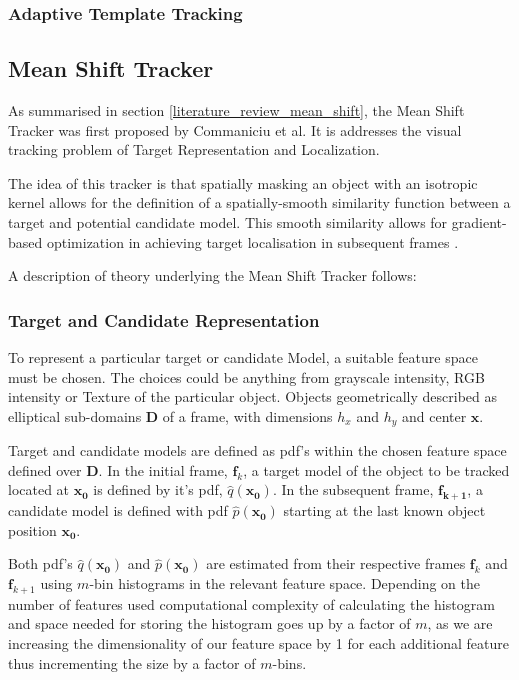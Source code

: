 \subsubsection{Adaptive Template Tracking}


\subsection{Mean Shift Tracker}
As summarised in section \ref{literature_review_mean_shift}, the Mean Shift Tracker was
first proposed by Commaniciu et al. It is addresses the
visual tracking problem of Target Representation and Localization.

The idea of this tracker is that spatially masking an object with an
isotropic kernel allows for the definition of a spatially-smooth similarity
function between a target and potential candidate model. This smooth similarity
allows for gradient-based optimization in achieving target localisation in
subsequent frames \cite{Comaniciu2003}.

A description of theory underlying the Mean Shift Tracker follows:

\subsubsection{Target and Candidate Representation}
To represent a particular target or candidate Model, a suitable feature space
must be chosen. The choices could be anything from grayscale intensity, RGB
intensity or Texture of the particular object. Objects geometrically described 
as elliptical sub-domains $\mathbf{D}$ of a frame, with dimensions $h_x$ and
$h_y$ and center $\mathbf{x}$.

Target and candidate models are defined as pdf's within the chosen feature
space defined over $\mathbf{D}$. In the initial frame, $\mathbf{f}_k$, a target
model of the object to be tracked located at $\mathbf{x_0}$ is defined by it's
pdf, $\hat{q}(\mathbf{x_0})$. In the subsequent frame, $\mathbf{f_{k+1}}$, a
candidate model is defined with pdf $\hat{p}(\mathbf{x_0})$ starting at the last
known object position $\mathbf{x_0}$. 

Both pdf's $\hat{q}(\mathbf{x_0})$ and $\hat{p}(\mathbf{x_0})$ are estimated from
their respective frames $\mathbf{f}_k$ and $\mathbf{f}_{k+1}$ using $m$-bin
histograms in the relevant feature space. Depending on the number of
features used computational complexity of calculating the histogram and space
needed for storing the histogram goes up by a factor of $m$, as we are
increasing the dimensionality of our feature space by 1 for each additional
feature thus incrementing the size by a factor of $m$-bins.

